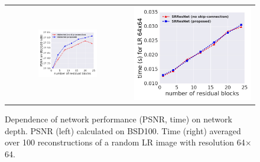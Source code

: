 \documentclass[10pt,twocolumn,letterpaper]{article}
\begin{document}
\begin{figure}[ht!]
\begin{tabular}{cc}
\includegraphics[width=0.5\textwidth]{images/used/appendix/jpg/psnr_vs_depth} &
\includegraphics[width=0.5 \textwidth]{images/used/appendix/jpg/time_vs_depth}\\
\end{tabular}
\caption{Dependence of network performance (PSNR, time) on network depth. PSNR (left) calculated on BSD100. Time (right) averaged over 100 reconstructions of a random LR image with resolution 64$\times$64.}
\label{fig:app_psnrtime}
\end{figure}

\clearpage
\end{document}
